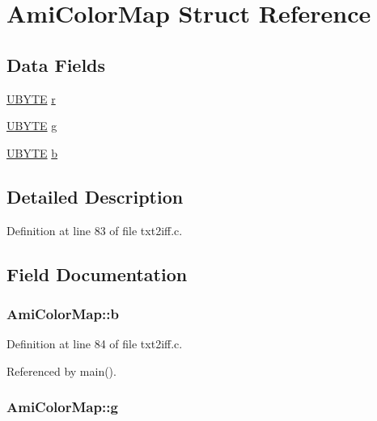 \hypertarget{structAmiColorMap}{\section{Ami\+Color\+Map Struct Reference}
\label{structAmiColorMap}
}
\subsection*{Data Fields}
\begin{DoxyCompactItemize}
\item 
\hyperlink{bitmfile_8h_aa068c7f96c3fdd66282567bcb068db80}{U\+B\+Y\+T\+E} \hyperlink{structAmiColorMap_a8b9d73fc2dcbf034454e8d0b56a27a46}{r}
\item 
\hyperlink{bitmfile_8h_aa068c7f96c3fdd66282567bcb068db80}{U\+B\+Y\+T\+E} \hyperlink{structAmiColorMap_aec94baea86f5766314623257503c4122}{g}
\item 
\hyperlink{bitmfile_8h_aa068c7f96c3fdd66282567bcb068db80}{U\+B\+Y\+T\+E} \hyperlink{structAmiColorMap_ab0fbd66365804a974c45683b40e14ff4}{b}
\end{DoxyCompactItemize}


\subsection{Detailed Description}


Definition at line 83 of file txt2iff.\+c.



\subsection{Field Documentation}
\hypertarget{structAmiColorMap_ab0fbd66365804a974c45683b40e14ff4}{
\subsubsection[{b}]{ Ami\+Color\+Map\+::b}}\label{structAmiColorMap_ab0fbd66365804a974c45683b40e14ff4}


Definition at line 84 of file txt2iff.\+c.



Referenced by main().

\hypertarget{structAmiColorMap_aec94baea86f5766314623257503c4122}{
\subsubsection[{g}]{ Ami\+Color\+Map\+::g}}\label{structAmiColorMap_aec94baea86f5766314623257503c4122}


